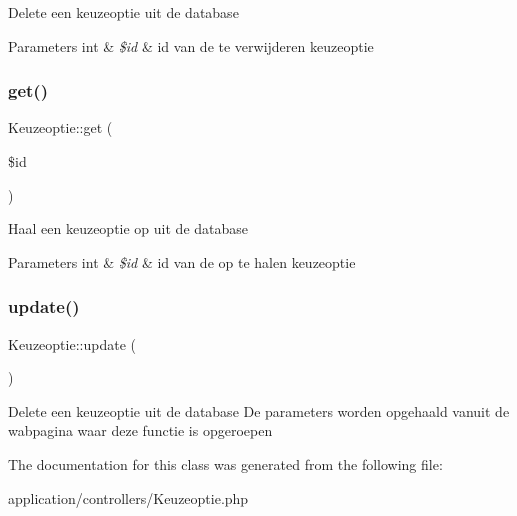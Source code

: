 Delete een keuzeoptie uit de database 
\begin{DoxyParams}[1]{Parameters}
int & {\em \$id} & id van de te verwijderen keuzeoptie \\
\hline
\end{DoxyParams}
\mbox{\label{class_keuzeoptie_abe1857ac53d46fe3f2ff1e601c46739a}} 
\subsubsection{\texorpdfstring{get()}{get()}}
{\footnotesize\ttfamily Keuzeoptie\+::get (\begin{DoxyParamCaption}\item[{}]{\$id }\end{DoxyParamCaption})}

Haal een keuzeoptie op uit de database 
\begin{DoxyParams}[1]{Parameters}
int & {\em \$id} & id van de op te halen keuzeoptie \\
\hline
\end{DoxyParams}
\mbox{\label{class_keuzeoptie_abb3bade0f37d81dc061789c5a3dba930}} 
\subsubsection{\texorpdfstring{update()}{update()}}
{\footnotesize\ttfamily Keuzeoptie\+::update (\begin{DoxyParamCaption}{ }\end{DoxyParamCaption})}

Delete een keuzeoptie uit de database De parameters worden opgehaald vanuit de wabpagina waar deze functie is opgeroepen 

The documentation for this class was generated from the following file\+:\begin{DoxyCompactItemize}
\item 
application/controllers/Keuzeoptie.\+php\end{DoxyCompactItemize}
